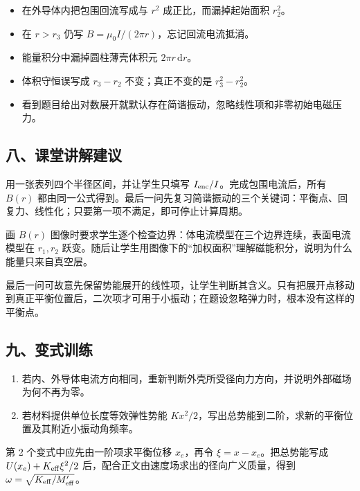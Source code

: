 \documentclass[12pt,a4paper,UTF8]{ctexart}
\newcommand{\tightlist}{\setlength{\itemsep}{0pt}\setlength{\parskip}{0pt}}
\begin{document}
\begin{itemize}
\tightlist
\item
  在外导体内把包围回流写成与 \(r^2\) 成正比，而漏掉起始面积 \(r_2^2\)。
\item
  在 \(r>r_3\) 仍写 \(B=\mu_0I/(2\pi r)\)，忘记回流电流抵消。
\item
  能量积分中漏掉圆柱薄壳体积元 \(2\pi r\,\mathrm dr\)。
\item
  体积守恒误写成 \(r_3-r_2\) 不变；真正不变的是 \(r_3^2-r_2^2\)。
\item
  看到题目给出对数展开就默认存在简谐振动，忽略线性项和非零初始电磁压力。
\end{itemize}

\subsection{八、课堂讲解建议}\label{ux516bux8bfeux5802ux8bb2ux89e3ux5efaux8bae-3}

用一张表列四个半径区间，并让学生只填写
\(I_{\rm enc}/I\)。完成包围电流后，所有 \(B(r)\)
都由同一公式得到。最后一问先复习简谐振动的三个关键词：平衡点、回复力、线性化；只要第一项不满足，即可停止计算周期。

画 \(B(r)\)
图像时要求学生逐个检查边界：体电流模型在三个边界连续，表面电流模型在
\(r_1,r_2\)
跃变。随后让学生用图像下的``加权面积''理解磁能积分，说明为什么能量只来自真空层。

最后一问可故意先保留势能展开的线性项，让学生判断其含义。只有把展开点移动到真正平衡位置后，二次项才可用于小振动；在题设忽略弹力时，根本没有这样的平衡点。

\subsection{九、变式训练}\label{ux4e5dux53d8ux5f0fux8badux7ec3-3}

\begin{enumerate}
\def\labelenumi{\arabic{enumi}.}
\tightlist
\item
  若内、外导体电流方向相同，重新判断外壳所受径向力方向，并说明外部磁场为何不再为零。
\item
  若材料提供单位长度等效弹性势能
  \(Kx^2/2\)，写出总势能到二阶，求新的平衡位置及其附近小振动角频率。
\end{enumerate}

第 2 个变式中应先由一阶项求平衡位移 \(x_e\)，再令
\(\xi=x-x_e\)。把总势能写成 \(U(x_e)+K_{\rm eff}\xi^2/2\)
后，配合正文由速度场求出的径向广义质量，得到
\(\omega=\sqrt{K_{\rm eff}/M_{\rm eff}'}\)。
\end{document}
